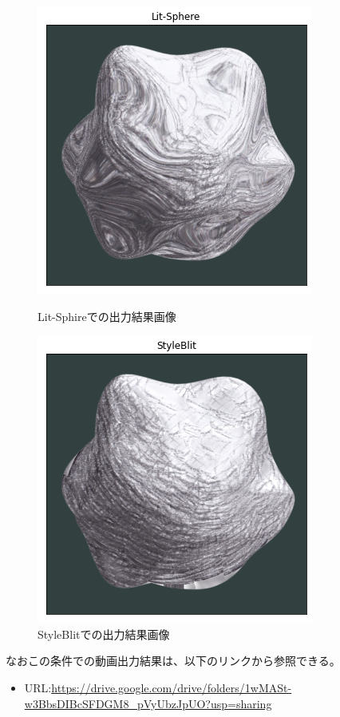 \documentclass[dvipdfmx]{jsarticle}
\begin{document}
\begin{figure}[H]
 \begin{minipage}{0.5\hsize}
  \begin{center}
   \includegraphics[scale=0.4]{images/blo_lit_out4.png}
  \end{center}
  \caption{Lit-Sphireでの出力結果画像}
 \end{minipage}
 \begin{minipage}{0.5\hsize}
  \begin{center}
   \includegraphics[scale=0.4]{images/blo_style_out4.png}
  \end{center}
  \caption{StyleBlitでの出力結果画像}
 \end{minipage}
\end{figure}
なおこの条件での動画出力結果は、以下のリンクから参照できる。
\begin{itemize}
  \item URL:\url{https://drive.google.com/drive/folders/1wMASt-w3BbsDIBcSFDGM8_pVyUbzJpUO?usp=sharing}
\end{itemize}
\end{document}
